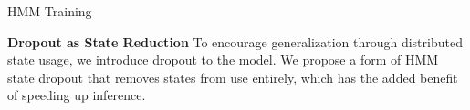 \documentclass[11pt,a4paper]{article}
\begin{document}
\begin{algorithm}[t]
\begin{algorithmic}
    \EndFor

\end{algorithmic}
\caption{
\label{fig:algo}
HMM Training
}
\end{algorithm}

\vspace{0.2cm}

\noindent
\textbf{Dropout as State Reduction}
To encourage generalization through distributed state usage, we introduce dropout to the model. 
We propose a form of HMM state dropout that removes states from use entirely,
which has the added benefit of speeding up inference.


\end{document}
